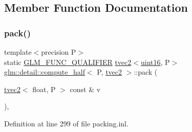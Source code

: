 \subsection{Member Function Documentation}
\mbox{\label{structglm_1_1detail_1_1compute__half_3_01_p_00_01tvec2_01_4_ad4f9aae8c371dfc6bb0c566beac0d172}} 
\subsubsection{\texorpdfstring{pack()}{pack()}}
{\footnotesize\ttfamily template$<$precision P$>$ \\
static \mbox{\hyperlink{setup_8hpp_a33fdea6f91c5f834105f7415e2a64407}{G\+L\+M\+\_\+\+F\+U\+N\+C\+\_\+\+Q\+U\+A\+L\+I\+F\+I\+ER}} \mbox{\hyperlink{structglm_1_1tvec2}{tvec2}}$<$\mbox{\hyperlink{namespaceglm_1_1detail_a47b2a7d006d187338e8031a352d1ce56}{uint16}}, P$>$ \mbox{\hyperlink{structglm_1_1detail_1_1compute__half}{glm\+::detail\+::compute\+\_\+half}}$<$ P, \mbox{\hyperlink{structglm_1_1tvec2}{tvec2}} $>$\+::pack (\begin{DoxyParamCaption}\item[{\mbox{\hyperlink{structglm_1_1tvec2}{tvec2}}$<$ float, P $>$ const \&}]{v }\end{DoxyParamCaption})\hspace{0.3cm}{\ttfamily [inline]}, {\ttfamily [static]}}



Definition at line 299 of file packing.\+inl.

\mbox{\label{structglm_1_1detail_1_1compute__half_3_01_p_00_01tvec2_01_4_a6458eaa1f6f937b70380469ad6c17f5e}} 
